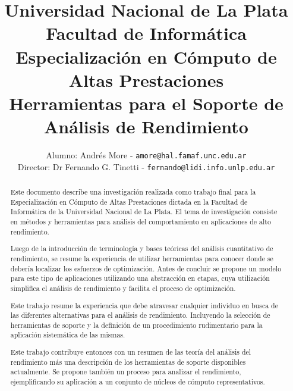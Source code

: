 \documentclass[a4paper]{report}
\begin{document}
\title{Universidad Nacional de La Plata\\Facultad de Inform\'atica\\ \bigskip
  Especializaci\'on en C\'omputo de Altas Prestaciones\\ \bigskip
  Herramientas para el Soporte de An\'alisis de Rendimiento}

\author{
  Alumno: Andr\'es More - {\tt amore@hal.famaf.unc.edu.ar}\\
  Director: Dr Fernando G. Tinetti - {\tt fernando@lidi.info.unlp.edu.ar}
}


\maketitle

\begin{abstract}

  Este documento describe una investigaci\'on realizada como trabajo final para
  la Especializaci\'on en C\'omputo de Altas Prestaciones dictada en la
  Facultad de Inform\'atica de la Universidad Nacional de La Plata.
  El tema de investigaci\'on consiste en m\'etodos y herramientas para
  an\'alisis del comportamiento en aplicaciones de alto rendimiento.

  \bigskip

  Luego de la introducci\'on de terminolog\'ia y bases te\'oricas del
  an\'alisis cuantitativo de rendimiento, se resume la experiencia de utilizar
  herramientas para conocer donde se deber\'ia localizar los esfuerzos de
  optimizaci\'on. Antes de concluir se propone un modelo para este tipo de
  aplicaciones utilizando una abstracci\'on en etapas, cuya
  utilizaci\'on simplifica el an\'alisis de rendimiento y facilita el proceso de optimizaci\'on.

  \bigskip

  Este trabajo resume la experiencia que debe atravesar cualquier
  individuo en busca de las diferentes alternativas para el an\'alisis de
  rendimiento. Incluyendo la selecci\'on de herramientas de soporte y la
  definici\'on de un procedimiento rudimentario para la aplicaci\'on sistem\'atica
  de las mismas.

  \bigskip

  Este trabajo contribuye entonces con un resumen de las teor\'ia del an\'alisis del
  rendimiento m\'as una descripci\'on de los herramientas de soporte 
  disponibles actualmente. Se propone tambi\'en un proceso para analizar el
  rendimiento, ejemplificando su aplicaci\'on a un conjunto de n\'ucleos de
  c\'omputo representativos.

\end{abstract}
\end{document}
